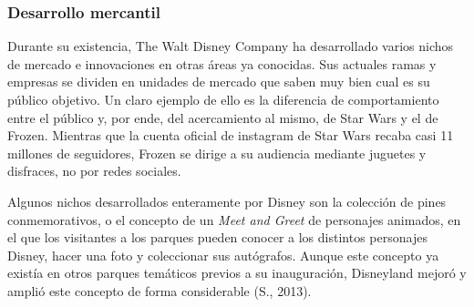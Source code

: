 \subsubsection{Desarrollo mercantil}
Durante su existencia, The Walt Disney Company ha desarrollado varios nichos de mercado e innovaciones en otras áreas ya conocidas. Sus actuales ramas y empresas se dividen en unidades de mercado que saben muy bien cual es su público objetivo. Un claro ejemplo de ello es la diferencia de comportamiento entre el público y, por ende, del acercamiento al mismo, de Star Wars y el de Frozen. Mientras que la cuenta oficial de instagram de Star Wars recaba casi 11 millones de seguidores, Frozen se dirige a su audiencia mediante juguetes y disfraces, no por redes sociales.
 
Algunos nichos desarrollados enteramente por Disney son la colección de pines conmemorativos, o el concepto de un \textit{Meet and Greet} de personajes animados, en el que los visitantes a los parques pueden conocer a los distintos personajes Disney, hacer una foto y coleccionar sus autógrafos. Aunque este concepto ya existía en otros parques temáticos previos a su inauguración, Disneyland mejoró y amplió este concepto de forma considerable (S., 2013).


 
 